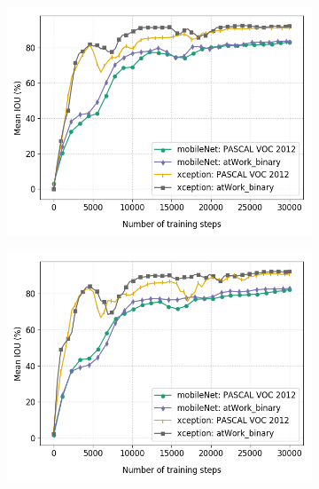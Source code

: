 	
	\begin{figure}
		\begin{subfigure}{.3\textwidth}
			\centering
			\includegraphics[width=1\linewidth]{images/transfer_size}
			\caption{}
		\end{subfigure}
		\begin{subfigure}{.3\textwidth}
			\centering
			\includegraphics[width=1\linewidth]{images/transfer_shape}
			\caption{}
		\end{subfigure}
		\begin{subfigure}{.3\textwidth}
			\centering

\end{subfigure}
\end{figure}
